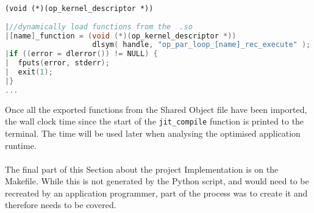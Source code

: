 \verb|(void (*)(op_kernel_descriptor *))|
\vspace{1em}
\begin{lstlisting}[backgroundcolor=\color{red!20}, language=C]
|//dynamically load functions from the  .so
|[name]_function = (void (*)(op_kernel_descriptor *))
                    dlsym( handle, "op_par_loop_[name]_rec_execute" );
|if ((error = dlerror()) != NULL) {
|  fputs(error, stderr);
|  exit(1);
|}
...
\end{lstlisting}
\par
\noindent Once all the exported functions from the Shared Object file have been imported, the wall clock time since the start of the \verb|jit_compile| function is printed to the terminal. The time will be used later when analysing the optimised application runtime.\\
\\
The final part of this Section about the project Implementation is on the Makefile. While this is not generated by the Python script, and would need to be recreated by an application programmer, part of the process was to create it and therefore needs to be covered.
\clearpage
